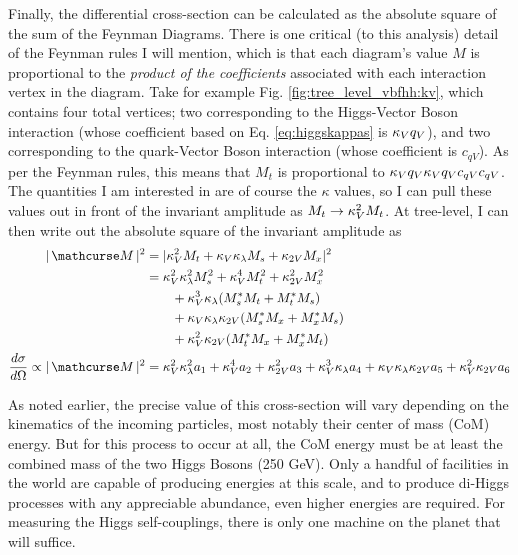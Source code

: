     Finally, the differential cross-section can be calculated as the absolute square of the sum of the Feynman Diagrams.
    There is one critical (to this analysis) detail of the Feynman rules I will mention,
        which is that each diagram's value $M$ is proportional to the \textit{product of the coefficients}
        associated with each interaction vertex in the diagram.
    Take for example Fig. \ref{fig:tree_level_vbfhh:kv}, which contains four total vertices;
        two corresponding to the Higgs-Vector Boson interaction (whose coefficient based on Eq. \ref{eq:higgskappas} is $\kappa_{V} q_V$),
        and two corresponding to the quark-Vector Boson interaction (whose coefficient is $c_{qV}$).
    As per the Feynman rules, this means that $M_t$ is proportional to $\kappa_{V} q_V \kappa_{V} q_V c_{qV} c_{qV}$.
    The quantities I am interested in are of course the $\kappa$ values,
        so I can pull these values out in front of the invariant amplitude as $M_t \rightarrow \kappa_{V}^2 M_t$.
    At tree-level, I can then write out the absolute square of the invariant amplitude as
    \begin{equation} \begin{split} \label{eq:tree_level_invamp}
        |\invAmp|^2 &= |  \kv^2 M_t + \kv \kl M_s + \kvv M_x |^2
        \\&= \kv^2 \kl^2 M_s^2 + \kv^4 M_t^2 + \kvv^2 M_x^2 
            \\&\qquad + \kv^3 \kl (M_s^* M_t + M_t^* M_s) 
            \\&\qquad + \kv \kl \kvv (M_s^* M_x + M_x^* M_s ) 
            \\&\qquad + \kv^2 \kvv (M_t^* M_x + M_x^* M_t )
        \\\dXsec \propto |\invAmp|^2 &= \kv^2 \kl^2 a_1 + \kv^4 a_2 + \kvv^2 a_3 + \kv^3 \kl a_4 + \kv \kl \kvv a_5 + \kv^2 \kvv a_6
    \end{split} \end{equation}

    As noted earlier, the precise value of this cross-section will vary depending on the kinematics of the incoming particles,
        most notably their center of mass (CoM) energy.
    But for this process to occur at all, the CoM energy must be at least the combined mass of the two Higgs Bosons (250 GeV).
    Only a handful of facilities in the world are capable of producing energies at this scale,
        and to produce di-Higgs processes with any appreciable abundance,
        even higher energies are required.
    For measuring the Higgs self-couplings, there is only one machine on the planet that will suffice.

